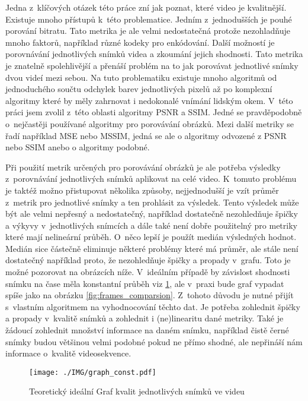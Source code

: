\documentclass[thesis=M,czech]{FITthesis}[2016/06/26]
\begin{document}
Jedna z~klíčových otázek této práce zní jak poznat, které video je kvalitnější. Existuje mnoho přístupů k~této problematice. Jedním z~jednodušších je pouhé porování bitratu. Tato metrika je ale velmi nedostatečná protože nezohladňuje mnoho faktorů, například různé kodeky pro enkódování. Další možností je porovnávání jednotlivých snímků videa a zkoumání jejich shodnosti. Tato metrika je znatelně spolehlivější a přenáší problém na to jak porovávat jednotlivé snímky dvou videí mezi sebou. Na tuto problematiku existuje mnoho algoritmů od jednoduchého součtu odchylek barev jednotlivých pixelů až po komplexní algoritmy které by měly zahrnovat i nedokonalé vnímání lidským okem. V~této práci jsem zvolil z~této oblasti algoritmy PSNR a SSIM. Jedné se pravděpodobně o~nejčastěji používané algoritmy pro porovávání obrázků. Mezi další metriky se řadí například MSE nebo MSSIM, jedná se ale o algoritmy odvozené z PSNR nebo SSIM anebo o algoritmy podobné\cite{otherref}.

Při použití metrik určených pro porovávání obrázků je ale potřeba výsledky z~porovnávání jednotlivých snímků aplikovat na celé video. K~tomuto problému je taktéž možno přistupovat několika způsoby, nejjednodušší je vzít průměr z~metrik pro jednotlivé snímky a ten prohlásit za výsledek. Tento výsledek může být ale velmi nepřesný a nedostatečný, například dostatečně nezohledňuje špičky a výkyvy v~jednotlivých snímcích a dále také není dobře použitelný pro metriky které mají nelineární průběh. O~něco lepší je použít medián výsledných hodnot. Medián sice částečně eliminuje některé problémy které má průměr, ale stále není dostatečný například proto, že nezohledňuje špičky a propady v~grafu. Toto je možné pozorovat na obrázcích níže. V~ideálním případě by závislost shodnosti snímku na čase měla konstantní průběh viz \ref{fig:theory_graph}, ale v~praxi bude graf vypadat spíše jako na obrázku \ref{fig:frames_comparsion}. Z~tohoto důvodu je nutné přijít s~vlastním algoritmem na vyhodnocování těchto dat. Je potřeba zohlednit špičky a propady v~kvalitě snímků a zohlednit i (ne)linearitu dané metriky. Také je žádoucí zohlednit množství informace na daném snímku, například čistě černé snímky budou většinou velmi podobné pokud ne přímo shodné, ale nepřináší nám informace o~kvalitě videosekvence.

\begin{figure}\centering
\texttt{[image: ./IMG/graph\_const.pdf]}
\caption{Teoretický ideální Graf kvalit jednotlivých snímků ve videu}
\label{fig:theory_graph}
\end{figure}
\end{document}
